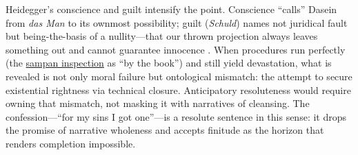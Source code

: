Heidegger's conscience and guilt intensify the point. Conscience ``calls'' Dasein from \emph{das
	Man} to its ownmost possibility; guilt (\emph{Schuld}) names not juridical fault but
being-the-basis of a nullity—that our thrown projection always leaves something out and cannot
guarantee innocence \parencite[\S\S 57--60, pp.~311--354]{HeideggerBT1962}. When procedures run
perfectly (the \hyperref[scene:sampan]{sampan inspection} as ``by the book'') and still yield
devastation, what is revealed is not only moral failure but ontological mismatch: the attempt
to secure existential rightness via technical closure. Anticipatory resoluteness would require
owning that mismatch, not masking it with narratives of cleansing. The confession—``for my
sins I got one''—is a resolute sentence in this sense: it drops the promise of narrative
wholeness and accepts
finitude as the horizon that renders completion impossible.
